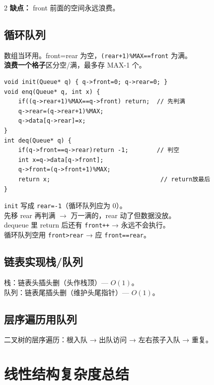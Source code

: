 \documentclass[10pt,a4paper]{article}
\begin{document}
\begin{multicols}{2}
\textbf{缺点：} front 前面的空间永远浪费。

\subsection*{循环队列}

数组当环用。front=rear 为空，\texttt{(rear+1)\%MAX==front} 为满。\\
\textbf{浪费一个格子}区分空/满，最多存 MAX-1 个。

\begin{lstlisting}
void init(Queue* q) { q->front=0; q->rear=0; }
void enq(Queue* q, int x) {
    if((q->rear+1)%MAX==q->front) return;  // 先判满
    q->rear=(q->rear+1)%MAX;
    q->data[q->rear]=x;
}
int deq(Queue* q) {
    if(q->front==q->rear)return -1;        // 判空
    int x=q->data[q->front];
    q->front=(q->front+1)%MAX;
    return x;                               // return放最后
}
\end{lstlisting}

\begin{bugbox}
\texttt{init} 写成 \texttt{rear=-1}（循环队列应为 0）。\\
先移 rear 再判满 $\to$ 万一满的，rear 动了但数据没放。\\
dequeue 里 return 后还有 \texttt{front++} → 永远不会执行。\\
循环队列空用 \texttt{front>rear} → 应 \texttt{front==rear}。
\end{bugbox}

\subsection*{链表实现栈/队列}

栈：链表头插头删（头作栈顶）— $O(1)$。\\
队列：链表尾插头删（维护头尾指针）— $O(1)$。

\subsection*{层序遍历用队列}

二叉树的层序遍历：根入队 → 出队访问 → 左右孩子入队 → 重复。

\end{multicols}

\section*{线性结构复杂度总结}
\end{document}
